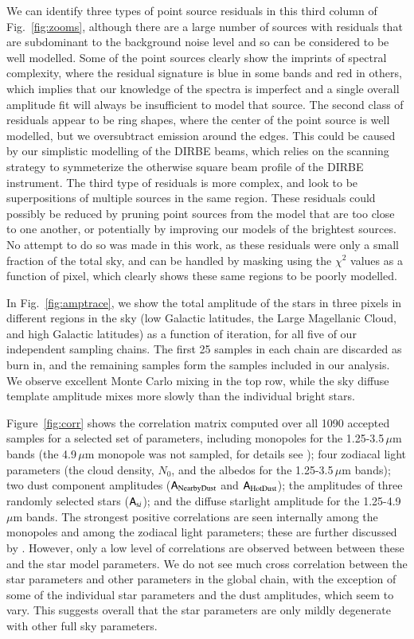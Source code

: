 \documentclass{aa}
\newcommand{\A}[0]{\tens{A}}
\begin{document}
We can identify three types of point source residuals in this third column of Fig.~\ref{fig:zooms}, although there are a large number of sources with residuals that are subdominant to the background noise level and so can be considered to be well modelled. Some of the point sources clearly show the imprints of spectral complexity, where the residual signature is blue in some bands and red in others, which implies that our knowledge of the spectra is imperfect and a single overall amplitude fit will always be insufficient to model that source. The second class of residuals appear to be ring shapes, where the center of the point source is well modelled, but we oversubtract emission around the edges. This could be caused by our simplistic modelling of the DIRBE beams, which relies on the scanning strategy to symmeterize the otherwise square beam profile of the DIRBE instrument. The third type of residuals is more complex, and look to be superpositions of multiple sources in the same region. These residuals could possibly be reduced by pruning point sources from the model that are too close to one another, or potentially by improving our models of the brightest sources. No attempt to do so was made in this work, as these residuals were only a small fraction of the total sky, and can be handled by masking using the $\chi^2$ values as a function of pixel, which clearly shows these same regions to be poorly modelled.

In Fig.~\ref{fig:amptrace}, we show the total amplitude of the stars in three pixels in different regions in the sky (low Galactic latitudes, the Large Magellanic Cloud, and high Galactic latitudes) as a function of iteration, for all five of our  independent sampling chains. The first 25 samples in each chain are discarded as burn in, and the remaining samples form the samples included in our analysis. We observe excellent Monte Carlo mixing in the top row, while the sky diffuse template amplitude mixes more slowly than the individual bright stars.

Figure~\ref{fig:corr} shows the correlation matrix computed over all 1090 accepted samples for a selected set of parameters, including monopoles for the 1.25-3.5\,$\mu$m bands (the 4.9\,$\mu$m monopole was not sampled, for details see \citet{CG02_03}); four zodiacal light parameters (the cloud density, $N_0$, and the albedos for the 1.25-3.5\,$\mu$m bands); two dust component amplitudes ($\A_{\mathrm{NearbyDust}}$ and $\A_{\mathrm{HotDust}}$); the amplitudes of three randomly selected stars ($\A_{\mathrm{s}i}$); and the diffuse starlight amplitude for the 1.25-4.9\,$\mu$m bands. The strongest positive correlations are seen internally among the monopoles and among the zodiacal light parameters; these are further discussed by \citep{CG02_01, CG02_02}. However, only a low level of correlations are observed between between these and the star model parameters. We do not see much cross correlation between the star parameters and other parameters in the global chain, with the exception of some of the individual star parameters and the dust amplitudes, which seem to vary. This suggests overall that the star parameters are only mildly degenerate with other full sky parameters.
\end{document}
